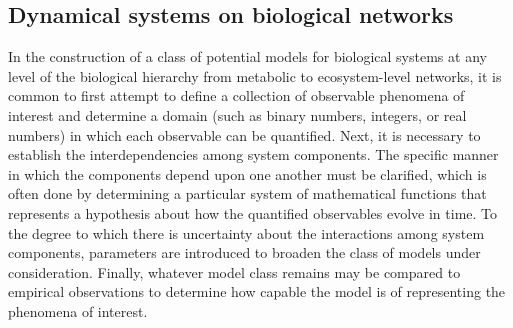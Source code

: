 
\subsection{Dynamical systems on biological networks}
In the construction of a class of potential models for biological systems at any level of the biological hierarchy from metabolic to ecosystem-level networks, it is common to first attempt to define a collection of observable phenomena of interest and determine a domain (such as binary numbers, integers, or real numbers) in which each observable can be quantified. Next, it is necessary to establish the interdependencies among system components. The specific manner in which the components depend upon one another must be clarified, which is often done by determining a particular system of mathematical functions that represents a hypothesis about how the quantified observables evolve in time. To the degree to which there is uncertainty about the interactions among system components, parameters are introduced to broaden the class of models under consideration. Finally, whatever model class remains may be compared to empirical observations to determine how capable the model is of representing the phenomena of interest.

